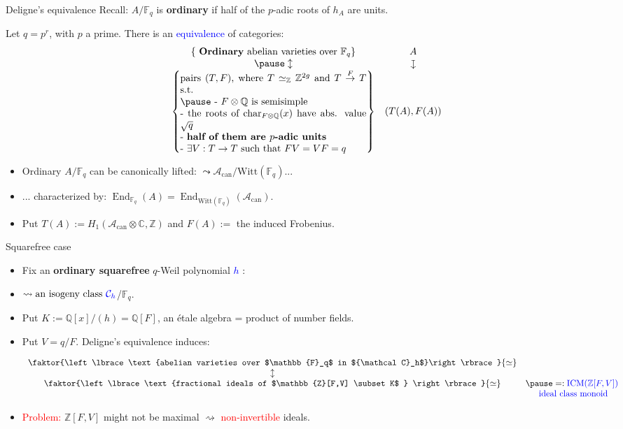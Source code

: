 \documentclass[usenames,dvipsnames]{beamer}
\def\Q{\mathbb{Q}}
\def\Z{\mathbb{Z}}
\def\C{\mathbb{C}}
\def\F{\mathbb{F}}
\DeclareMathOperator{\Char}{char}
\DeclareMathOperator{\ICM}{ICM}
\DeclareMathOperator{\End}{End}
\newcommand{\cA}{{\mathcal A}}
\newcommand{\cC}{{\mathcal C}}
\newcommand{\downmapsto}{\rotatebox[origin=c]{-90}{$\large\mapsto$}\mkern2mu} %
\newcommand{\set}[1]{\left\lbrace#1\right\rbrace }
\newcommand{\red}[1]{\textcolor{red}{#1}}
\newcommand{\blue}[1]{\textcolor{blue}{#1}}
\begin{document}
\begin{frame}{ Deligne's equivalence }
	Recall: $A/\F_q$ is {\bf ordinary} if half of the $p$-adic roots of $h_A$ are units.
\pause
	\begin{theorem}[Deligne '69]
	Let $q=p^r$, with $p$ a prime.
	There is an \blue{equivalence} of categories:
	\[ \begin{array}{cc}
	\set{\text{ {\bf Ordinary} abelian varieties over } \F_q } 	& A \\
\pause
	\updownarrow											& \downmapsto \\
	\set{\parbox[p]{19em}{pairs $(T,F)$, where $T\simeq_\Z \Z^{2g}$ and $T\overset{F}{\to} T$ s.t.\\
\pause
	- $F\otimes \Q$ is semisimple\\
	- the roots of $\Char_{F\otimes\Q}(x)$ have abs. value $\sqrt{q}$\\
	- \textbf{half of them are $p$-adic units}\\
	- $\exists V:T\to T$ such that $FV=VF=q$
	}}	& (T(A),F(A))
	\end{array} \]
	\end{theorem}
\pause
	\begin{itemize}
		\item Ordinary $A/\F_q$ can be canonically lifted: $\leadsto \cA_{\mathrm{can}}/\mathrm{Witt}(\F_q)$...
\pause
		\item ... characterized by: $\End_{\F_q}(A) = \End_{\mathrm{Witt}(\F_q)}(\cA_{\mathrm{can}})$.
\pause
		\item Put $T(A):=H_1(\cA_{\mathrm{can}}\otimes \C,\Z) $
\pause
		and $F(A):=$ the induced Frobenius.
	\end{itemize}
\end{frame}

\begin{frame}{Squarefree case}
	\begin{itemize}
	\item Fix an \textbf{ordinary squarefree} $q$-Weil polynomial \blue{$h$} :
\pause  
	\item  $\rightsquigarrow \text{an isogeny class } \blue{\cC_h}$/$\F_q$.
\pause 
	\item Put $K := \Q[x]/(h)=\Q[F]$, an \'etale algebra = product of number fields.
\pause
	\item Put $V=q/F$. Deligne's equivalence induces:
\pause
			\begin{theorem}
			\[\begin{array}{cc}
			\faktor{\set{\text{abelian varieties over $\F_q$ in $\cC_h$}}}{\simeq} & \\
			\updownarrow & \\
			\faktor{\set{ \text{fractional ideals of $\Z[F,V] \subset K$ } }}{\simeq} &
\pause =:  \blue{\ICM(\Z[F,V])}\\ 
			& \blue{\text{ ideal class monoid} }
				\end{array}\]
			\end{theorem}
\pause
	\item \red{Problem:} $\Z[F,V]$ might not be maximal $\rightsquigarrow $ \red{non-invertible} ideals.
	\end{itemize}
\end{frame}
\end{document}
